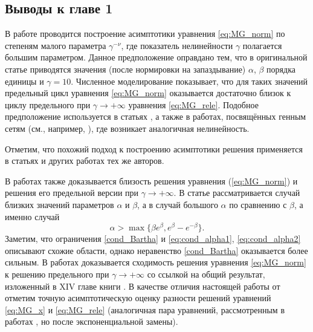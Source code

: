 \subsection{Выводы к главе 1}

В работе проводится построение асимптотики уравнения \eqref{eq:MG_norm} по степеням малого параметра $\gamma^{-\nu}$, где показатель нелинейности $\gamma$ полагается большим параметром. Данное предположение оправдано тем, что в оригинальной статье \cite{Mackey1977} приводятся значения (после нормировки на запаздывание) $\alpha$, $\beta$ порядка единицы и $\gamma = 10$. Численное моделирование показывает, что для таких значений предельный цикл уравнения \eqref{eq:MG_norm} оказывается достаточно близок к циклу предельного при $\gamma \to +\infty$ уравнения \eqref{eq:MG_rele}. Подобное предположение используется в статьях \cite{Bartha2021, Krisztin2020}, а также в работах, посвящённых генным сетям (см., например, \cite{Volokitin2004}), где возникает аналогичная нелинейность.

Отметим, что похожий подход к построению асимптотики решения применяется в статьях \cite{Kolesov2010, Kolesov1997, Glyzin2013} и других работах тех же авторов.

В работах \cite{Bartha2021,Krisztin2020} также доказывается близость решения уравнения (\ref{eq:MG_norm}) и решения его предельной версии при $\gamma\to+\infty$. В статье \cite{Krisztin2020} рассматривается случай близких значений параметров $\alpha$ и $\beta$, а в \cite{Bartha2021} случай большого $\alpha$  по сравнению с $\beta$, а именно случай 
\begin{equation}
	\label{cond_Bartha}
	\alpha>\max\{\beta e^\beta, e^\beta-e^{-\beta}\}.
\end{equation}
Заметим, что ограничения \eqref{cond_Bartha} и \eqref{eq:cond_alpha1}, \eqref{eq:cond_alpha2} описывают схожие области, однако неравенство \eqref{cond_Bartha} оказывается более сильным. 
В работах \cite{Bartha2021,Krisztin2020} доказывается сходимость решения уравнения \eqref{eq:MG_norm} к решению предельного при $\gamma\to+\infty$ со ссылкой на общий результат, изложенный в XIV главе книги \cite{Diekmann1995}.
В качестве отличия настоящей работы от \cite{Bartha2021} отметим точную асимптотическую оценку разности решений уравнений \eqref{eq:MG_x} и \eqref{eq:MG_rele} (аналогичная пара уравнений, рассмотренным в  работах \cite{Bartha2021,Krisztin2020}, но после экспоненциальной замены).



